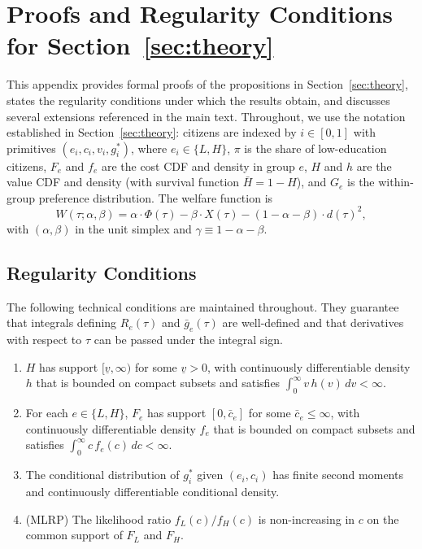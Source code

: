 \section{Proofs and Regularity Conditions for Section~\ref{sec:theory}}
\label{sec:theory_proofs}

This appendix provides formal proofs of the propositions in Section~\ref{sec:theory}, states the regularity conditions under which the results obtain, and discusses several extensions referenced in the main text. Throughout, we use the notation established in Section~\ref{sec:theory}: citizens are indexed by $i \in [0, 1]$ with primitives $(e_i, c_i, v_i, g_i^*)$, where $e_i \in \{L, H\}$, $\pi$ is the share of low-education citizens, $F_e$ and $f_e$ are the cost CDF and density in group $e$, $H$ and $h$ are the value CDF and density (with survival function $\bar H = 1 - H$), and $G_e$ is the within-group preference distribution. The welfare function is
\[
W(\tau; \alpha, \beta) = \alpha \cdot \Phi(\tau) - \beta \cdot X(\tau) - (1 - \alpha - \beta) \cdot d(\tau)^2,
\]
with $(\alpha, \beta)$ in the unit simplex and $\gamma \equiv 1 - \alpha - \beta$.

\subsection{Regularity Conditions}
\label{ssec:proofs_regularity}

The following technical conditions are maintained throughout. They guarantee that integrals defining $R_e(\tau)$ and $\bar g_e(\tau)$ are well-defined and that derivatives with respect to $\tau$ can be passed under the integral sign.

\hypertarget{regularitycondition.1}{}
\begin{regularitycondition}
\label{cond:regularity}
\begin{enumerate}
    \item[(a)] $H$ has support $[\underline v, \infty)$ for some $\underline v > 0$, with continuously differentiable density $h$ that is bounded on compact subsets and satisfies $\int_0^\infty v \, h(v)\, dv < \infty$.
    \item[(b)] For each $e \in \{L, H\}$, $F_e$ has support $[0, \bar c_e]$ for some $\bar c_e \leq \infty$, with continuously differentiable density $f_e$ that is bounded on compact subsets and satisfies $\int_0^\infty c \, f_e(c) \, dc < \infty$.
    \item[(c)] The conditional distribution of $g_i^*$ given $(e_i, c_i)$ has finite second moments and continuously differentiable conditional density.
    \item[(d)] (MLRP) The likelihood ratio $f_L(c)/f_H(c)$ is non-increasing in $c$ on the common support of $F_L$ and $F_H$.
\end{enumerate}
\end{regularitycondition}

